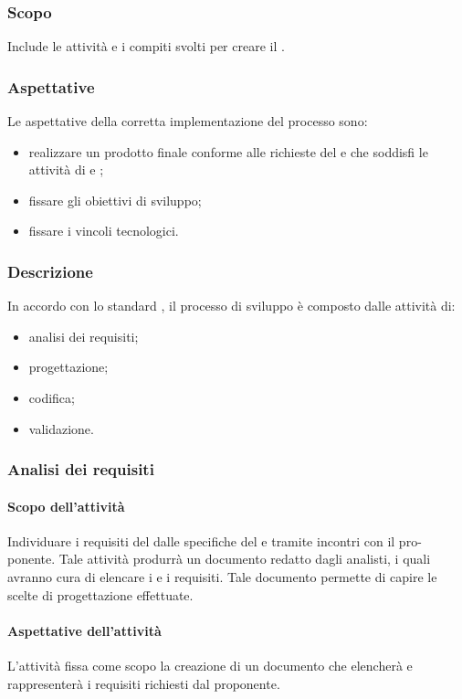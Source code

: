\subsubsection{Scopo}
Include le attività e i compiti svolti per creare il .
\subsubsection{Aspettative}
Le aspettative della corretta implementazione del processo sono:
\begin{itemize}
		\item realizzare un prodotto finale conforme alle richieste del  e che soddisfi le attività di  e ;
		\item fissare gli obiettivi di sviluppo;
		\item fissare i vincoli tecnologici.
\end{itemize}

\subsubsection{Descrizione}
In accordo con lo standard , il processo di sviluppo è composto dalle attività di:
\begin{itemize}
		\item analisi dei requisiti;
		\item progettazione;
		\item codifica;
		\item validazione.
\end{itemize}

\subsubsection{Analisi dei requisiti}
 \paragraph{Scopo dell'attività}
  Individuare i requisiti del  dalle specifiche del  e tramite incontri con il pro-
  ponente. Tale attività produrrà un documento redatto dagli analisti, i quali avranno cura di elencare i  e i requisiti. Tale documento permette di
 capire le scelte di progettazione effettuate.
 \paragraph{Aspettative dell'attività}
 L'attività fissa come scopo la creazione di un documento che elencherà e rappresenterà i requisiti richiesti dal proponente.
